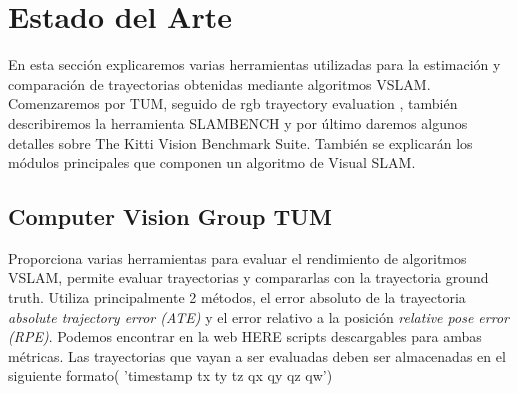 \section{Estado del Arte} \label{s:estado}

En esta sección explicaremos varias herramientas utilizadas para la estimación y comparación de trayectorias obtenidas mediante algoritmos VSLAM.
Comenzaremos por TUM, seguido de rgb trayectory evaluation , también describiremos la herramienta SLAMBENCH y por último daremos algunos detalles sobre The Kitti Vision Benchmark Suite.
También se explicarán los módulos principales que componen un algoritmo de Visual SLAM.


\subsection{Computer Vision Group TUM}
Proporciona varias herramientas para evaluar el rendimiento de algoritmos VSLAM, permite evaluar trayectorias y compararlas con la trayectoria ground truth.\cite{sturm12iros}
Utiliza principalmente 2 métodos, el error absoluto de la trayectoria \textit{absolute trajectory error (ATE)} y el error relativo a la posición \textit{relative pose error (RPE)}. Podemos encontrar en la web HERE scripts descargables para ambas métricas.
Las trayectorias que vayan a ser evaluadas deben ser almacenadas en el siguiente formato( 'timestamp tx ty tz qx qy qz qw')


